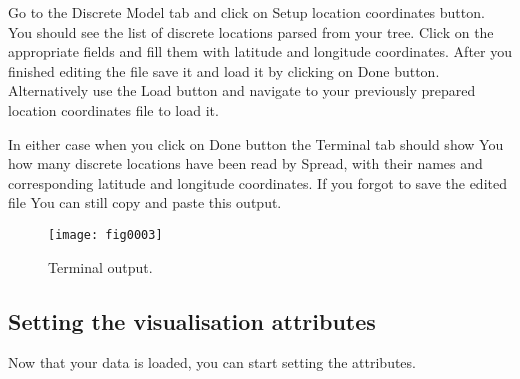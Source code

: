 Go to the Discrete Model tab and click on Setup location coordinates
button. You should see the list of discrete locations parsed from
your tree. Click on the appropriate fields and fill them with latitude
and longitude coordinates. After you finished editing the file save
it and load it by clicking on Done button. Alternatively use the Load
button and navigate to your previously prepared location coordinates
file to load it. 

In either case when you click on Done button the Terminal tab should
show You how many discrete locations have been read by Spread, with
their names and corresponding latitude and longitude coordinates.
If you forgot to save the edited file You can still copy and paste
this output.

\begin{figure}[H]
\begin{centering}
\texttt{[image: fig0003]}
\caption{Terminal output.}
\label{fig:0003}
\par\end{centering}
\end{figure}

\subsection{Setting the visualisation attributes}

Now that your data is loaded, you can start setting the attributes.


